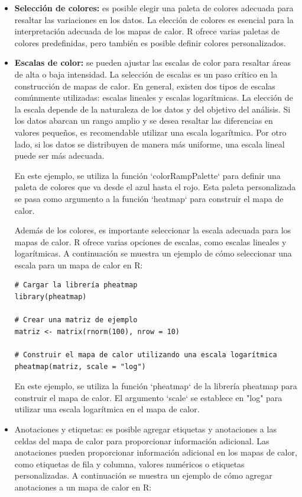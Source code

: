 \documentclass{article}
\begin{document}
\begin{itemize}
\item  \textbf{Selección de colores: }es posible elegir una paleta de colores adecuada para resaltar las variaciones en los datos. La elección de colores es esencial para la interpretación adecuada de los mapas de calor. R ofrece varias paletas de colores predefinidas, pero también es posible definir colores personalizados.

\item  \textbf{Escalas de color: }se pueden ajustar las escalas de color para resaltar áreas de alta o baja intensidad. La selección de escalas es un paso crítico en la construcción de mapas de calor. En general, existen dos tipos de escalas comúnmente utilizadas: escalas lineales y escalas logarítmicas. La elección de la escala depende de la naturaleza de los datos y del objetivo del análisis. Si los datos abarcan un rango amplio y se desea resaltar las diferencias en valores pequeños, es recomendable utilizar una escala logarítmica. Por otro lado, si los datos se distribuyen de manera más uniforme, una escala lineal puede ser más adecuada.


En este ejemplo, se utiliza la función `colorRampPalette` para definir una paleta de colores que va desde el azul hasta el rojo. Esta paleta personalizada se pasa como argumento a la función `heatmap` para construir el mapa de calor.

Además de los colores, es importante seleccionar la escala adecuada para los mapas de calor. R ofrece varias opciones de escalas, como escalas lineales y logarítmicas. A continuación se muestra un ejemplo de cómo seleccionar una escala para un mapa de calor en R:

\begin{verbatim}
# Cargar la librería pheatmap
library(pheatmap)

# Crear una matriz de ejemplo
matriz <- matrix(rnorm(100), nrow = 10)

# Construir el mapa de calor utilizando una escala logarítmica
pheatmap(matriz, scale = "log")
\end{verbatim}

En este ejemplo, se utiliza la función `pheatmap` de la librería pheatmap para construir el mapa de calor. El argumento `scale` se establece en "log" para utilizar una escala logarítmica en el mapa de calor.

    
    \item Anotaciones y etiquetas: es posible agregar etiquetas y anotaciones a las celdas del mapa de calor para proporcionar información adicional.  Las anotaciones pueden proporcionar información adicional en los mapas de calor, como etiquetas de fila y columna, valores numéricos o etiquetas personalizadas. A continuación se muestra un ejemplo de cómo agregar anotaciones a un mapa de calor en R:


\end{itemize}
\end{document}
